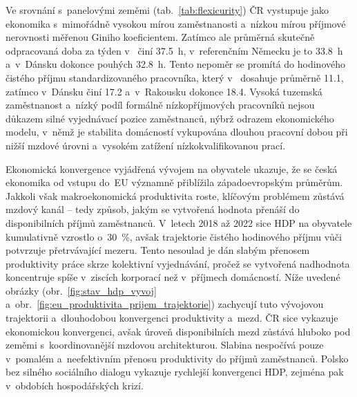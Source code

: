 Ve srovnání s~panelovými zeměmi (tab.~\ref{tab:flexicurity}) \ac{ČR} vystupuje jako ekonomika s~mimořádně vysokou mírou zaměstnanosti a~nízkou mírou příjmové nerovnosti měřenou Giniho koeficientem. Zatímco ale průměrná skutečně odpracovaná doba za týden v~ činí \SI{37,5}{\hour}, v~referenčním Německu je to \SI{33,8}{\hour} a~v~Dánsku dokonce pouhých \SI{32,8}{\hour}. Tento nepoměr se promítá do hodinového čistého příjmu standardizovaného pracovníka, který v~ dosahuje průměrně \SI{11,1}{\pps}, zatímco v~Dánsku činí \SI{17,2}{\pps} a~v~Rakousku dokonce \SI{18,4}{\pps}. Vysoká tuzemská zaměstnanost a~nízký podíl formálně nízkopříjmových pracovníků nejsou důkazem silné vyjednávací pozice zaměstnanců, nýbrž odrazem ekonomického modelu, v~němž je stabilita domácností vykupována dlouhou pracovní dobou při nižší mzdové úrovni a~vysokém zatížení nízkokvalifikovanou prací.\par



Ekonomická konvergence vyjádřená vývojem  na obyvatele ukazuje, že se česká ekonomika od vstupu do~\acs{EU} významně přiblížila západoevropským průměrům. Jakkoli však makroekonomická produktivita roste, klíčovým problémem zůstává mzdový kanál -- tedy způsob, jakým se vytvořená hodnota přenáší do disponibilních příjmů zaměstnanců. V~letech 2018 až 2022 sice \ac{HDP} na obyvatele kumulativně vzrostlo o~\SI{30}{\percent}, avšak trajektorie čistého hodinového příjmu vůči  potvrzuje přetrvávající mezeru. Tento nesoulad je dán slabým přenosem produktivity práce skrze kolektivní vyjednávání, pročež se vytvořená nadhodnota koncentruje spíše v~ziscích korporací než v~příjmech domácností. Níže uvedené obrázky (obr.~\ref{fig:stav_hdp_vyvoj} a~obr.~\ref{fig:eu_produktivita_prijem_trajektorie}) zachycují tuto vývojovou trajektorii a~dlouhodobou konvergenci produktivity a~mezd. \ac{ČR} sice vykazuje ekonomickou konvergenci, avšak úroveň disponibilních mezd zůstává hluboko pod zeměmi s~koordinovanější mzdovou architekturou. Slabina nespočívá pouze v~pomalém a~neefektivním přenosu produktivity do příjmů zaměstnanců. Polsko bez silného sociálního dialogu vykazuje rychlejší konvergenci \acs{HDP}, zejména pak v~obdobích hospodářských krizí.\par





